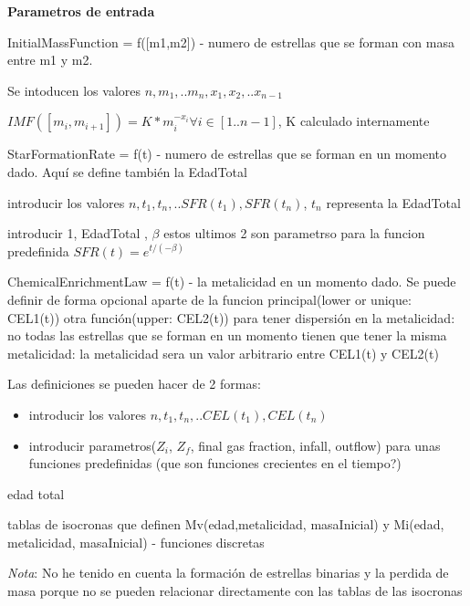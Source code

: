 \documentclass[10pt]{book}
\begin{document}
\textbf{Parametros de entrada}
\begin{description}
\item InitialMassFunction = f([m1,m2]) - numero de estrellas que se forman con masa entre m1 y m2. 
	\begin{description}
	\item Se intoducen los valores $ n, m_1, .. m_n, x_1, x_2, .. x_{n-1}$ 
 	\item $IMF([m_i,m_{i+1}]) =  K * m_i  ^ {-x_i} \forall i \in [1..n-1]$, K calculado internamente
\end{description}
\item StarFormationRate = f(t) - numero de estrellas que se forman en un momento dado. Aquí se define también la EdadTotal
	\begin{description}
	\item introducir los valores $n, t_1, t_n, ..SFR(t_1), SFR(t_n)$, $t_n$ representa la EdadTotal
	\item introducir 1, EdadTotal , $\beta$	estos ultimos 2 son parametrso para la funcion predefinida $SFR(t) = e^{t/(-\beta)}$
	\end{description}
\item ChemicalEnrichmentLaw = f(t) - la metalicidad en un momento dado. 
Se puede definir de forma opcional aparte de la funcion principal(lower or unique: CEL1(t))  otra función(upper: CEL2(t)) para tener dispersión en la metalicidad: no todas las estrellas que se forman en un momento tienen que tener la misma metalicidad: la metalicidad sera un valor arbitrario entre CEL1(t) y CEL2(t)

 Las definiciones se pueden hacer de 2 formas: 
	\begin{itemize}
		\item introducir los valores $n, t_1, t_n, ..CEL(t_1), CEL(t_n)$
		\item introducir parametros($Z_i$, $Z_f$, final gas fraction, infall, outflow) para unas funciones predefinidas (que son funciones crecientes en el tiempo?)
	\end{itemize}
\item edad total
\item tablas de isocronas que definen Mv(edad,metalicidad, masaInicial) y Mi(edad, metalicidad, masaInicial) - funciones discretas 
\end{description}
\emph{Nota}: No he tenido en cuenta la formación de estrellas binarias y la perdida de masa porque no se pueden relacionar directamente con las tablas de las isocronas
\end{document}
